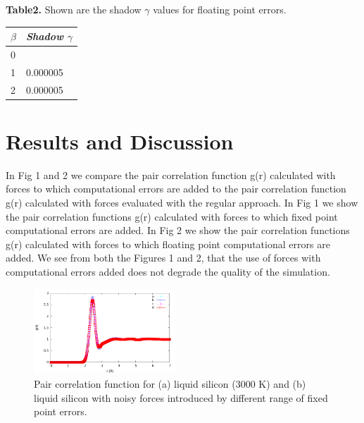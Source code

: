\documentclass[aps,pre,twocolumn,showpacs,preprintnumbers,amsmath,amssymb]{revtex4-1}
\begin{document}
\textbf{Table2.} Shown are the shadow \(\gamma\) values for floating point errors.\\

\begin{table}[h!]
\begin{tabular}{|l|l|}
\hline
\textit{\(\beta\) } & \textit{Shadow \(\gamma\)} \\ \hline
0             &                       \\ \hline
1             & 0.000005              \\ \hline
2             & 0.000005              \\ \hline
\end{tabular}
\end{table}
 
\section{Results and Discussion}

 In Fig 1 and 2 we compare the pair correlation function g(r) calculated with forces to which computational errors are added to the pair correlation function g(r) calculated with forces evaluated with the regular approach. In Fig 1 we show the pair correlation functions g(r) calculated with forces to which fixed point computational errors are added. In Fig 2 we show the pair correlation functions g(r) calculated with forces to which floating point computational errors are added.  We see from both the Figures 1 and 2, that the use of forces with computational errors added does not degrade the quality of the simulation. 

\begin{figure}[h!]%
\begin{center}
\includegraphics[width=0.475\textwidth]
{figures/rdffixedpt.pdf}
\end{center}
\caption{\label{Fig1}
Pair correlation function for (a) liquid silicon (3000 K) and (b) liquid silicon with noisy forces introduced by different range of fixed point errors.
} \end{figure}
\end{document}
